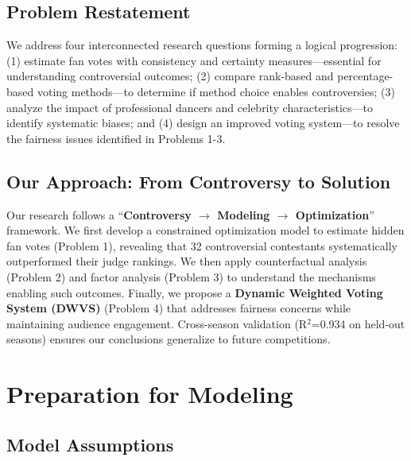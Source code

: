 \documentclass{mcmthesis}
\begin{document}
\subsection{Problem Restatement}

We address four interconnected research questions forming a logical progression: (1) estimate fan votes with consistency and certainty measures---essential for understanding controversial outcomes; (2) compare rank-based and percentage-based voting methods---to determine if method choice enables controversies; (3) analyze the impact of professional dancers and celebrity characteristics---to identify systematic biases; and (4) design an improved voting system---to resolve the fairness issues identified in Problems 1-3.

\subsection{Our Approach: From Controversy to Solution}

Our research follows a ``\textbf{Controversy $\rightarrow$ Modeling $\rightarrow$ Optimization}'' framework. We first develop a constrained optimization model to estimate hidden fan votes (Problem 1), revealing that 32 controversial contestants systematically outperformed their judge rankings. We then apply counterfactual analysis (Problem 2) and factor analysis (Problem 3) to understand the mechanisms enabling such outcomes. Finally, we propose a \textbf{Dynamic Weighted Voting System (DWVS)} (Problem 4) that addresses fairness concerns while maintaining audience engagement. Cross-season validation (R$^2$=0.934 on held-out seasons) ensures our conclusions generalize to future competitions.

\section{Preparation for Modeling}

\subsection{Model Assumptions}
\end{document}
